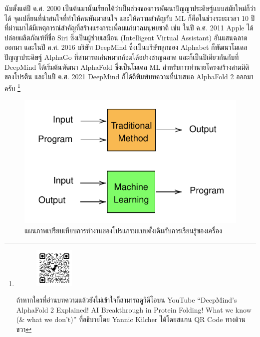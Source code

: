 นับตั้งแต่ปี ค.ศ. 2000 เป็นต้นมานั้นเรียกได้ว่าเป็นช่วงของการพัฒนาปัญญาประดิษฐ์แบบสมัยใหม่ก็ว่าได้ จุดเปลี่ยนที่น่าสนใจที่ทำให้คนหันมาสนใจ%
และให้ความสำคัญกับ ML ก็คือในช่วงระยะเวลา 10 ปีที่ผ่านมาได้มีเหตุการณ์สำคัญที่สร้างแรงกระเพื่อมแก่มวลมนุษยชาติ เช่น ในปี ค.ศ. 2011 
Apple ได้ปล่อยผลิตภัณฑ์ที่ชื่อ Siri ซึ่งเป็นผู้ช่วยเสมือน (Intelligent Virtual Assistant) อันแสนฉลาดออกมา และในปี ค.ศ. 2016 
บริษัท DeepMind ซึ่งเป็นบริษัทลูกของ Alphabet ก็พัฒนาโมเดลปัญญาประดิษฐ์ AlphaGo ที่สามารถเล่นหมากล้อมได้อย่างชาญฉลาด 
และก็เป็นปีเดียวกันกับที่ DeepMind ได้เริ่มต้นพัฒนา AlphaFold ซึ่งเป็นโมเดล ML สำหรับการทำนายโครงสร้างสามมิติของโปรตีน และในปี ค.ศ. 
2021 DeepMind ก็ได้ตีพิมพ์บทความที่นำเสนอ AlphaFold 2 ออกมาครับ\autocite{jumper2021} 
\footnote{
\setlength\intextsep{0pt}
\begin{figure}
        \centering
        \includegraphics[width=0.18\textwidth]{fig/qr_code_alphafold2_explained.png}
\end{figure}
ถ้าหากใครที่อ่านบทความแล้วยังไม่เข้าใจก็สามารถดูวิดีโอบน YouTube \enquote{DeepMind's AlphaFold 2 Explained! 
AI Breakthrough in Protein Folding! What we know (\& what we don't)} ที่อธิบายโดย Yannic Kilcher ได้โดยสแกน 
QR Code ทางด้านขวา}


\begin{figure}[H]
    \centering
    \includegraphics[scale=1]{fig/ML-concept.pdf}
    \caption{แผนภาพเปรียบเทียบการทำงานของโปรแกรมแบบดั้งเดิมกับการเรียนรู้ของเครื่อง}
    \label{fig:ml_paradigm}
\end{figure}


